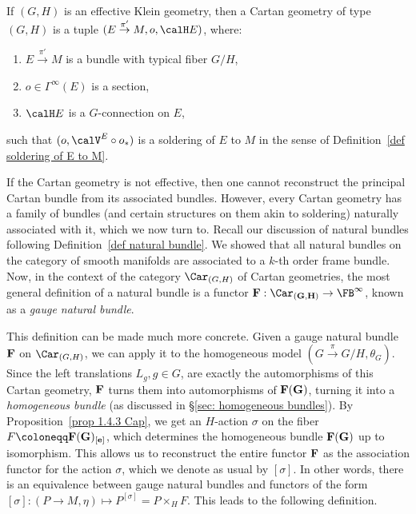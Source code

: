 \begin{defn}
    If $(G,H)$ is an effective Klein geometry, then a Cartan geometry of type $(G,H)$ is a tuple $(E\overset{\pi'}{\to}M,o,\calH E)$, where: 
    \begin{enumerate}
        \item $E\overset{\pi'}{\to}M$ is a bundle with typical fiber $G\slash H$, 
        \item $o\in\Gamma^\infty(E)$ is a section,
        \item $\calH E$ is a $G$-connection on $E$,
    \end{enumerate}
    such that $(o,\calV^E\circ o_\ast)$ is a soldering of $E$ to $M$ in the sense of Definition~\ref{def soldering of E to M}.
\end{defn}

If the Cartan geometry is not effective, then one cannot reconstruct the principal Cartan bundle from its associated bundles. However, every Cartan geometry has a family of bundles (and certain structures on them akin to soldering) naturally associated with it, which we now turn to. Recall our discussion of natural bundles following Definition~\ref{def natural bundle}. We showed that all natural bundles on the category of smooth manifolds are associated to a $k$-th order frame bundle. Now, in the context of the category $\Car_{(G,H)}$ of Cartan geometries, the most general definition of a natural bundle is a functor $\bf{F}:\Car_{(G,H)}\to \FB^\infty$, known as a \emph{gauge natural bundle}. 

This definition can be made much more concrete. Given a gauge natural bundle $\bf{F}$ on $\Car_{(G,H)}$, we can apply it to the homogeneous model $(G\overset{\pi}{\to} G\slash H,\theta_G)$. Since the left translations $L_g,g\in G$, are exactly the automorphisms of this Cartan geometry, $\bf{F}$ turns them into automorphisms of $\bf{F}(G)$, turning it into a \emph{homogeneous bundle} (as discussed in \S\ref{sec: homogeneous bundles}). By Proposition~\ref{prop 1.4.3 Cap}, we get an $H$-action $\sigma$ on the fiber $F\coloneqq \bf{F}(G)_{[e]}$, which determines the homogeneous bundle $\bf{F}(G)$ up to isomorphism. This allows us to reconstruct the entire functor $\bf{F}$ as the association functor for the action $\sigma$, which we denote as usual by $[\sigma]$. In other words, there is an equivalence between gauge natural bundles and functors of the form $[\sigma]:(P\to M,\eta)\mapsto P^{[\sigma]}=P\times_H F$. This leads to the following definition.

